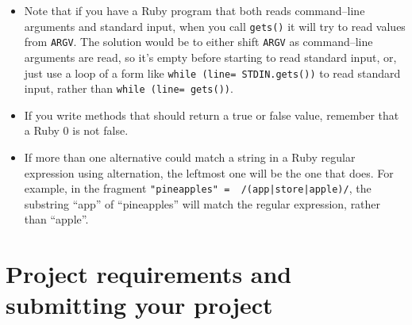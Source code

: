 \documentclass[11pt]{article}
\begin{document}
\begin{itemize}
      \item Note that if you have a Ruby program that both reads
            command--line arguments and standard input, when you call
            \texttt{gets()} it will try to read values from \texttt{ARGV}.
            The solution would be to either shift \texttt{ARGV} as
            command--line arguments are read, so it's empty before starting
            to read standard input, or, just use a loop of a form like
            \texttt{while (line= STDIN.gets())} to read standard input,
            rather than \texttt{while (line= gets())}.

      \item If you write methods that should return a true or false value,
            remember that a Ruby 0 is not false.

      \item If more than one alternative could match a string in a Ruby regular
            expression using alternation, the leftmost one will be the one
            that does.  For example, in the fragment
            \texttt{"pineapples" =\string~ /(app|store|apple)/}, the
            substring ``app'' of ``pineapples'' will match the regular
            expression, rather than ``apple''.

    \end{itemize}

    \vspace{-4.5mm}

  \section{Project requirements and submitting your project}
\end{document}
